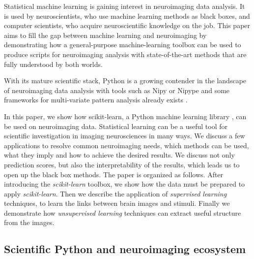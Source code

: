 \documentclass{frontiersSCNS} %
\begin{document}
Statistical machine learning is gaining interest in
neuroimaging data analysis. It is used by neuroscientists,
who use machine learning methods as black boxes, and computer scientists,
who acquire neuroscientific knowledge on the job. This paper aims to fill 
the gap between machine learning and neuroimaging by demonstrating how a 
general-purpose machine-learning toolbox can be used to produce scripts 
for neuroimaging analysis with state-of-the-art methods
that are fully understood by both worlds.

With its mature scientific stack, Python is a growing contender in the
landscape of neuroimaging data analysis with tools such as Nipy
\citep{millman2007analysis} or Nipype \citep{gorgolewski2011} and some
frameworks for multi-variate pattern analysis already exists
\citep{hanke2009pymvpa}. 

In this paper, we show how scikit-learn, a Python machine learning
library \citep{pedregosa2011}, can be used on neuroimaging data.
Statistical learning can be a useful tool for scientific investigation in
imaging neurosciences in many ways. We discuss a few applications to
resolve common neuroimaging needs, which methods can be used, what they
imply and how to achieve the desired results. We discuss not only
prediction scores, but also the interpretability of the results, which
leads us to open up the black box methods. The paper is organized as
follows. After introducing the \emph{scikit-learn} toolbox, we show 
how the data must be prepared to apply
\emph{scikit-learn}. Then we describe the application of \emph{supervised
learning} techniques, to learn the links between brain images and
stimuli. Finally we demonstrate how \emph{unsupervised learning}
techniques can extract useful structure from the images.


\subsection{Scientific Python and neuroimaging ecosystem}
\end{document}
